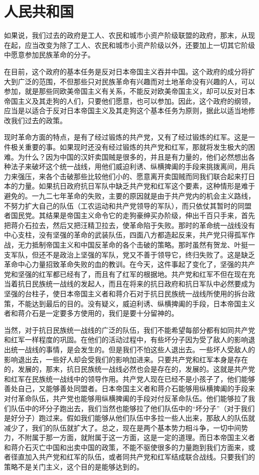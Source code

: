 \section{人民共和国}

如果说，我们过去的政府是工人、农民和城市小资产阶级联盟的政府，那末，从现在起，应当改变为除了工人、农民和城市小资产阶级以外，还要加上一切其它阶级中愿意参加民族革命的分子。

在目前，这个政府的基本任务是反对日本帝国主义吞并中国。这个政府的成分将扩大到广泛的范围，不但那些只对民族革命有兴趣而对土地革命没有兴趣的人，可以参加，就是那些同欧美帝国主义有关系，不能反对欧美帝国主义，却可以反对日本帝国主义及其走狗的人们，只要他们愿意，也可以参加。因此，这个政府的纲领，应当是以适合于反对日本帝国主义及其走狗这个基本任务为原则，据此以适当地修改我们过去的政策。

现时革命方面的特点，是有了经过锻炼的共产党，又有了经过锻炼的红军。这是一件极关重要的事。如果现时还没有经过锻炼的共产党和红军，那就将发生极大的困难。为什么？因为中国的汉奸卖国贼是很多的，并且是有力量的，他们必然想出各种法子来破坏这个统一战线，用他们威迫利诱、纵横捭阖的手段来挑拨离间，用兵力来强压，来各个击破那些比较他们小的、愿意离开卖国贼而同我们联合起来打日本的力量。如果抗日政府抗日军队中缺乏共产党和红军这个要素，这种情形是难于避免的。一九二七年革命的失败，主要的原因就是由于共产党内的机会主义路线，不努力扩大自己的队伍（工农运动和共产党领导的军队），而只依仗其暂时的同盟者国民党。其结果是帝国主义命令它的走狗豪绅买办阶级，伸出千百只手来，首先把蒋介石拉去，然后又把汪精卫拉去，使革命陷于失败。那时的革命统一战线没有中心支柱，没有坚强的革命的武装队伍，四面八方都造起反来，共产党只得孤军作战，无力抵制帝国主义和中国反革命的各个击破的策略。那时虽然有贺龙、叶挺一支军队，但还不是政治上坚强的军队，党又不善于领导它，终归失败了。这是缺乏革命中心力量招致革命失败的血的教训。在今天，这件事起了变化了，坚强的共产党和坚强的红军都已经有了，而且有了红军的根据地。共产党和红军不但在现在充当着抗日民族统一战线的发起人，而且在将来的抗日政府和抗日军队中必然要成为坚强的台柱子，使日本帝国主义者和蒋介石对于抗日民族统一战线所使用的拆台政策，不能达到最后的目的。没有疑义，威迫利诱、纵横捭阖的手段，日本帝国主义者和蒋介石是一定要多方使用的，我们是要十分留神的。

当然，对于抗日民族统一战线的广泛的队伍，我们不能希望每部分都有如同共产党和红军一样程度的巩固。在他们的活动过程中，有些坏分子因为受了敌人的影响退出统一战线的事情，是会发生的。但是我们不怕这些人退出去。一些坏人受敌人的影响退出去，一些好人却会受我们的影响加进来。只要共产党和红军本身是存在的，发展的，那末，抗日民族统一战线必然也会是存在的，发展的。这就是共产党和红军在民族统一战线中的领导作用。共产党人现在已经不是小孩子了，他们能够善处自己，又能够善处同盟者。日本帝国主义者和蒋介石能够用纵横捭阖的手段来对付革命队伍，共产党也能够用纵横捭阖的手段对付反革命队伍。他们能够拉了我们队伍中的坏分子跑出去，我们当然也能够拉了他们队伍中的“坏分子”（对于我们是好分子）跑过来。假如我们能够从他们队伍中多拉一些人出来，那敌人的队伍就减少了，我们的队伍就扩大了。总之，现在是两个基本势力相斗争，一切中间势力，不附属于那一方面，就附属于这一方面，这是一定的道理。而日本帝国主义者和蒋介石灭亡中国和出卖中国的政策，不能不驱使很多的力量跑到我们方面来，或者径直加入共产党和红军的队伍，或者同共产党和红军结成联合战线。只要我们的策略不是关门主义，这个目的是能够达到的。

